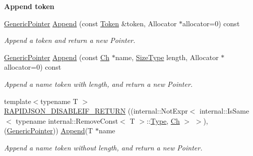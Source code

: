 \begin{Indent}\textbf{ Append token}\par
\begin{DoxyCompactItemize}
\item 
\hyperlink{class_generic_pointer}{Generic\+Pointer} \hyperlink{class_generic_pointer_aa8f86c0f330807f337351a95ae254b78}{Append} (const \hyperlink{struct_generic_pointer_1_1_token}{Token} \&token, Allocator $\ast$allocator=0) const
\begin{DoxyCompactList}\small\item\em Append a token and return a new Pointer. \end{DoxyCompactList}\item 
\hyperlink{class_generic_pointer}{Generic\+Pointer} \hyperlink{class_generic_pointer_a9f8a1711f5b8e0d951c25c6c65326f77}{Append} (const \hyperlink{class_generic_pointer_ab292356c11b4015c98d21b966b11f285}{Ch} $\ast$name, \hyperlink{rapidjson_8h_a5ed6e6e67250fadbd041127e6386dcb5}{Size\+Type} length, Allocator $\ast$allocator=0) const
\begin{DoxyCompactList}\small\item\em Append a name token with length, and return a new Pointer. \end{DoxyCompactList}\item 
{\footnotesize template$<$typename T $>$ }\\\hyperlink{class_generic_pointer_aaf4d7d852098878d24188d134182d42f}{R\+A\+P\+I\+D\+J\+S\+O\+N\+\_\+\+D\+I\+S\+A\+B\+L\+E\+I\+F\+\_\+\+R\+E\+T\+U\+RN} ((internal\+::\+Not\+Expr$<$ internal\+::\+Is\+Same$<$ typename internal\+::\+Remove\+Const$<$ T $>$\+::\hyperlink{rapidjson_8h_a1d1cfd8ffb84e947f82999c682b666a7}{Type}, \hyperlink{class_generic_pointer_ab292356c11b4015c98d21b966b11f285}{Ch} $>$ $>$),(\hyperlink{class_generic_pointer}{Generic\+Pointer})) \hyperlink{class_generic_pointer_aa8f86c0f330807f337351a95ae254b78}{Append}(T $\ast$name
\begin{DoxyCompactList}\small\item\em Append a name token without length, and return a new Pointer. \end{DoxyCompactList}\end{DoxyCompactItemize}
\end{Indent}
